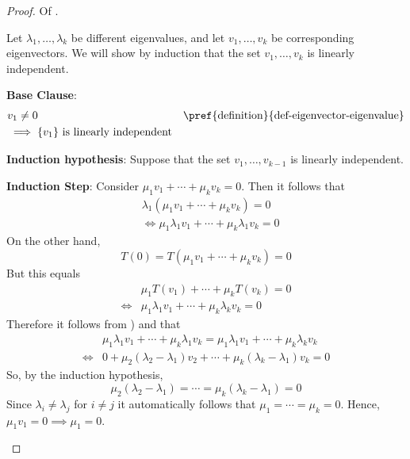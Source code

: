 \begin{proof}
	Of .
	\begin{flushleft}
		Let $\lambda_1,\dots,\lambda_k$ be different eigenvalues, and let $v_1,\dots,v_k$
		be corresponding eigenvectors. We will show by induction that the set $v_1,\dots,v_k$
		is linearly independent.
	\end{flushleft}
	\begin{flushleft}
		\textbf{Base Clause}:
		\begin{align*}
			 & v_1\neq0                                       &  & \text{\pref{definition}{def-eigenvector-eigenvalue}} \\
			 & \implies\{v_1\}\text{ is linearly independent}
		\end{align*}
	\end{flushleft}
	\begin{flushleft}
		\textbf{Induction hypothesis}: Suppose that the set $v_1,\dots,v_{k-1}$ is linearly independent.
	\end{flushleft}
	\begin{flushleft}
		\textbf{Induction Step}: Consider $\mu_1v_1+\cdots+\mu_kv_k=0$. Then it follows that
		\begin{align}
			 & \lambda_1(\mu_1v_1+\cdots+\mu_kv_k)=0\nonumber \\
			 & \Leftrightarrow
			\mu_1\lambda_1v_1+\cdots+\mu_k\lambda_1v_k=0\label{eq-tmp:1}
		\end{align}
		On the other hand,
		\begin{equation*}
			T(0)=T(\mu_1v_1+\cdots+\mu_kv_k)=0
		\end{equation*}
		But this equals
		\begin{align}
			 & \mu_1T(v_1)+\cdots+\mu_kT(v_k)=0\nonumber                    \\
			\Leftrightarrow
			 & \mu_1\lambda_1v_1+\cdots+\mu_k\lambda_kv_k=0\label{eq-tmp:2}
		\end{align}
		Therefore it follows from ) and  that
		\begin{align*}
			 & \mu_1\lambda_1v_1+\cdots+\mu_k\lambda_1v_k=\mu_1\lambda_1v_1+\cdots+\mu_k\lambda_kv_k \\
			\Leftrightarrow
			 & 0+\mu_2(\lambda_2-\lambda_1)v_2+\cdots+\mu_k(\lambda_k-\lambda_1)v_k=0
		\end{align*}
		So, by the induction hypothesis,
		\begin{equation*}
			\mu_2(\lambda_2-\lambda_1)=\cdots=\mu_k(\lambda_k-\lambda_1)=0
		\end{equation*}
		Since $\lambda_i\neq\lambda_j$ for $i\neq j$ it automatically follows
		that $\mu_1=\cdots=\mu_k=0$. Hence, $\mu_1v_1=0 \implies \mu_1=0$.
	\end{flushleft}
\end{proof}

